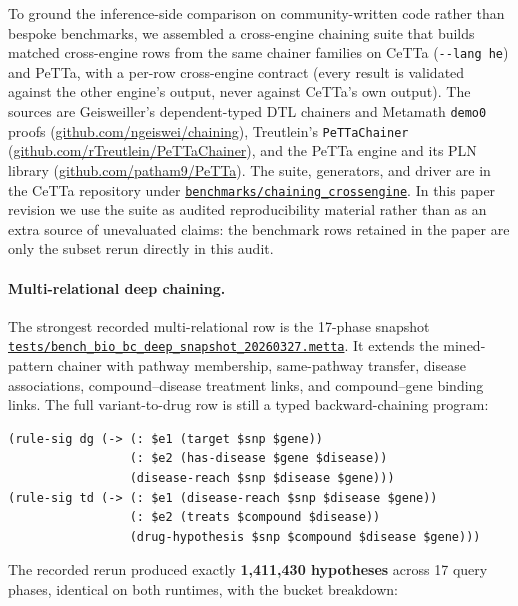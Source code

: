 \documentclass[11pt]{article}
\newcommand{\code}[1]{\texttt{#1}}
\newcommand{\PeTTa}{\textup{PeTTa}}
\newcommand{\CeTTa}{\textup{CeTTa}}
\begin{document}
To ground the inference-side comparison on community-written code
rather than bespoke benchmarks, we assembled a cross-engine chaining
suite that builds matched cross-engine rows from the same chainer
families on \CeTTa{} (\code{-{}-lang he}) and \PeTTa{}, with a per-row
cross-engine contract (every result is
validated against the other engine's output, never against \CeTTa{}'s
own output).  The sources are
Geisweiller's dependent-typed DTL chainers and Metamath \code{demo0}
proofs (\href{https://github.com/ngeiswei/chaining}{github.com/ngeiswei/chaining}),
Treutlein's \code{PeTTaChainer}
(\href{https://github.com/rTreutlein/PeTTaChainer}{github.com/rTreutlein/PeTTaChainer}),
and the \PeTTa{} engine and its PLN library
(\href{https://github.com/patham9/PeTTa}{github.com/patham9/PeTTa}).
The suite, generators, and driver are in the \CeTTa{} repository under
\href{https://github.com/zariuq/CeTTa/tree/07928677c0237a19b2f3c32dffca28d7d2626723/benchmarks/chaining_crossengine}{\code{benchmarks/chaining\_crossengine}}.
In this paper revision we use the suite as audited reproducibility
material rather than as an extra source of unevaluated claims: the
benchmark rows retained in the paper are only the subset rerun directly
in this audit.

\paragraph{Multi-relational deep chaining.}
The strongest recorded multi-relational row is the 17-phase snapshot
\href{https://github.com/zariuq/CeTTa/blob/07928677c0237a19b2f3c32dffca28d7d2626723/tests/bench_bio_bc_deep_snapshot_20260327.metta}{\code{tests/bench\_bio\_bc\_deep\_snapshot\_20260327.metta}}.
It extends the mined-pattern chainer with pathway membership,
same-pathway transfer, disease associations, compound--disease
treatment links, and compound--gene binding links.  The full
variant-to-drug row is still a typed backward-chaining program:
\begin{lstlisting}[language={},basicstyle=\ttfamily\scriptsize]
(rule-sig dg (-> (: $e1 (target $snp $gene))
                 (: $e2 (has-disease $gene $disease))
                 (disease-reach $snp $disease $gene)))
(rule-sig td (-> (: $e1 (disease-reach $snp $disease $gene))
                 (: $e2 (treats $compound $disease))
                 (drug-hypothesis $snp $compound $disease $gene)))
\end{lstlisting}
The recorded rerun produced exactly \textbf{1{,}411{,}430 hypotheses}
across 17 query phases, identical on both runtimes, with the bucket
breakdown:
\end{document}
